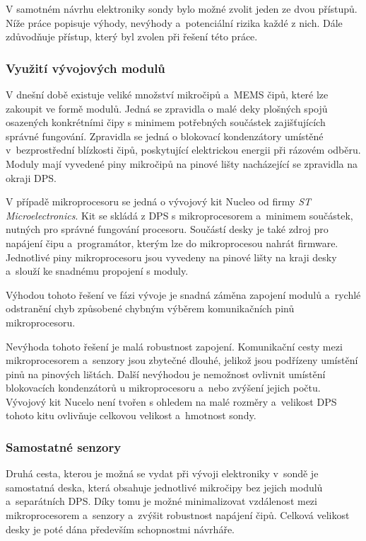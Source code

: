 \documentclass[twoside]{ctuthesis}
\theoremstyle{plain}
\theoremstyle{definition}
\theoremstyle{note}
\begin{document}
		V samotném návrhu elektroniky sondy bylo možné zvolit jeden ze dvou přístupů. Níže práce popisuje výhody, nevýhody a~potenciální rizika každé z nich. Dále zdůvodňuje přístup, který byl zvolen při řešení této práce.

			\subsubsection{Využití vývojových modulů}
			V dnešní době existuje veliké množství mikročipů a~MEMS čipů, které lze zakoupit ve formě modulů. Jedná se zpravidla o malé deky plošných spojů osazených konkrétními čipy s minimem potřebných součástek zajišťujících správné fungování. Zpravidla se jedná o blokovací kondenzátory umístěné v~bezprostřední blízkosti čipů, poskytující elektrickou energii při rázovém odběru. Moduly mají vyvedené piny mikročipů na pinové lišty nacházející se zpravidla na okraji DPS. 

			V případě mikroprocesoru se jedná o vývojový kit Nucleo od firmy \textit{ST Microelectronics}. Kit se skládá z DPS s mikroprocesorem a~minimem součástek, nutných pro správné fungování procesoru. Součástí desky je také zdroj pro napájení čipu a~programátor, kterým lze do mikroprocesou nahrát firmware. Jednotlivé piny mikroprocesoru jsou vyvedeny na pinové lišty na kraji desky a~slouží ke snadnému propojení s moduly. 

			Výhodou tohoto řešení ve fázi vývoje je snadná záměna zapojení modulů a~rychlé odstranění chyb způsobené chybným výběrem komunikačních pinů mikroprocesoru.

			Nevýhoda tohoto řešení je malá robustnost zapojení. Komunikační cesty mezi mikroprocesorem a~senzory jsou zbytečné dlouhé, jelikož jsou podřízeny umístění pinů na pinových lištách. Další nevýhodou je nemožnost ovlivnit umístění blokovacích kondenzátorů u mikroprocesoru a~nebo zvýšení jejich počtu. Vývojový kit Nucelo není tvořen s ohledem na malé rozměry a~velikost DPS tohoto kitu ovlivňuje celkovou velikost a~hmotnost sondy.

			\subsubsection{Samostatné senzory}
			Druhá cesta, kterou je možná se vydat při vývoji elektroniky v~sondě je samostatná deska, která obsahuje jednotlivé mikročipy bez jejich modulů a~separátních DPS. Díky tomu je možné minimalizovat vzdálenost mezi mikroprocesorem a~senzory a~zvýšit robustnost napájení čipů. Celková velikost desky je poté dána především schopnostmi návrháře. 
\end{document}
